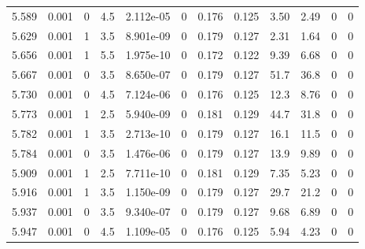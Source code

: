 \documentclass[preview]{standalone}
\begin{document}
{{{{{\begin{tabular}{L{1.2cm}C{1.2cm} C{0.3cm}C{0.5cm} C{1.4cm}C{1.4cm} C{1.4cm}C{1.4cm} C{1.6cm}C{1.6cm} C{1.6cm}C{1.6cm}}
  5.589  &  0.001  & 0     & 4.5 &  2.112e-05  & 0  &  0.176&   0.125& 3.50 & 2.49   &  0 & 0  \\ 
  5.629  &  0.001  & 1     & 3.5 &  8.901e-09  & 0  &  0.179&   0.127& 2.31 & 1.64   &  0 & 0  \\ 
  5.656  &  0.001  & 1     & 5.5 &  1.975e-10  & 0  &  0.172&   0.122& 9.39 & 6.68   &  0 & 0  \\ 
  5.667  &  0.001  & 0     & 3.5 &  8.650e-07  & 0  &  0.179&   0.127& 51.7 & 36.8   &  0 & 0  \\ 
  5.730  &  0.001  & 0     & 4.5 &  7.124e-06  & 0  &  0.176&   0.125& 12.3 & 8.76   &  0 & 0  \\ 
  5.773  &  0.001  & 1     & 2.5 &  5.940e-09  & 0  &  0.181&   0.129& 44.7 & 31.8   &  0 & 0  \\ 
  5.782  &  0.001  & 1     & 3.5 &  2.713e-10  & 0  &  0.179&   0.127& 16.1 & 11.5   &  0 & 0  \\ 
  5.784  &  0.001  & 0     & 3.5 &  1.476e-06  & 0  &  0.179&   0.127& 13.9 & 9.89   &  0 & 0  \\ 
  5.909  &  0.001  & 1     & 2.5 &  7.711e-10  & 0  &  0.181&   0.129& 7.35 & 5.23   &  0 & 0  \\ 
  5.916  &  0.001  & 1     & 3.5 &  1.150e-09  & 0  &  0.179&   0.127& 29.7 & 21.2   &  0 & 0  \\ 
  5.937  &  0.001  & 0     & 3.5 &  9.340e-07  & 0  &  0.179&   0.127& 9.68 & 6.89   &  0 & 0  \\ 
  5.947  &  0.001  & 0     & 4.5 &  1.109e-05  & 0  &  0.176&   0.125& 5.94 & 4.23   &  0 & 0  \\ 
\hline 
\end{tabular} 

}}}}}
\end{document}
